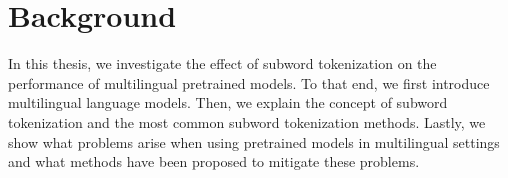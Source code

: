 



\chapter{Background}
\label{chap:background}



In this thesis, we investigate the effect of subword tokenization on the performance of multilingual pretrained models. To that end, we first introduce multilingual language models. Then, we explain the concept of subword tokenization and the most common subword tokenization methods. Lastly, we show what problems arise when using pretrained models in multilingual settings and what methods have been proposed to mitigate these problems.


